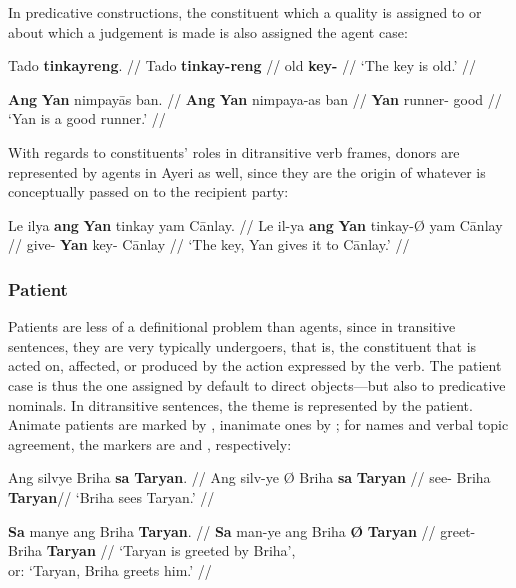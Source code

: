 \xe

In predicative constructions, the constituent which a quality is assigned to or 
about which a judgement is made is also assigned the agent case:

\pex
\a\begingl
	\gla Tado \textbf{tinkayreng}. //
	\glb Tado \textbf{tinkay-reng} //
	\glc old \textbf{key-\AargI{}} //
	\glft `The key is old.' //
\endgl

\a\begingl
	\gla \textbf{Ang} \textbf{Yan} nimpayās ban. //
	\glb \textbf{Ang} \textbf{Yan} nimpaya-as ban //
	\glc \textbf{\Aarg{}} \textbf{Yan} runner-\Parg{} good //
	\glft `Yan is a good runner.' //
\endgl

\xe


With regards to constituents' roles in ditransitive verb frames, donors are 
represented by agents in Ayeri as well, since they are the origin of whatever 
is conceptually passed on to the recipient party:

\ex\begingl
	\gla Le ilya \textbf{ang} \textbf{Yan} tinkay yam Cānlay. //
	\glb Le il-ya \textbf{ang} \textbf{Yan} tinkay-Ø yam Cānlay //
	\glc \PatT{} give-\TsgM{} \textbf{\Aarg{}} \textbf{Yan} key-\Top{} 
		\Dat{} Cānlay //
	\glft `The key, Yan gives it to Cānlay.' //
\endgl\xe

\subsubsection{Patient}

Patients are less of a definitional problem than agents, since in transitive 
sentences, they are very typically undergoers, that is, the constituent that is 
acted on, affected, or produced by the action expressed by the verb. The 
patient case is thus the one assigned by default to direct objects---but also 
to predicative nominals. In ditransitive sentences, the theme is represented by 
the patient. Animate patients are marked by , inanimate ones by 
; for names and verbal topic agreement, the markers are 
 and , respectively:

\pex
\a\begingl
	\gla Ang silvye {} Briha \textbf{sa} \textbf{Taryan}. //
	\glb Ang silv-ye Ø Briha \textbf{sa} \textbf{Taryan} //
	\glc \AgtT{} see-\TsgF{} \Top{} Briha \textbf{\Parg{}} \textbf{Taryan}//
	\glft `Briha sees Taryan.' //
\endgl

\a\begingl
	\gla \textbf{Sa} manye ang Briha \textbf{{}} \textbf{Taryan}. //
	\glb \textbf{Sa} man-ye ang Briha \textbf{Ø} \textbf{Taryan} //
	\glc \textbf{\PatT{}} greet-\TsgF{} \Aarg{} Briha \textbf{\Top{}} 
		\textbf{Taryan} //
	\glft `Taryan is greeted by Briha',\\
		or: `Taryan, Briha greets him.' //
\endgl

